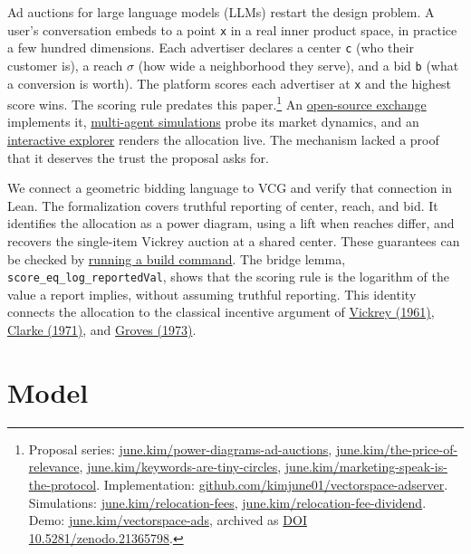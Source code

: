 Ad auctions for large language models (LLMs) restart the design problem.
A user's conversation embeds to a point \texttt{x} in a real inner
product space, in practice a few hundred dimensions. Each advertiser
declares a center \texttt{c} (who their customer is), a reach \(\sigma\)
(how wide a neighborhood they serve), and a bid \texttt{b} (what a
conversion is worth). The platform scores each advertiser at \texttt{x}
and the highest score wins. The scoring rule predates this
paper.\footnote{Proposal series:
  \href{https://june.kim/power-diagrams-ad-auctions}{june.kim/power-diagrams-ad-auctions},
  \href{https://june.kim/the-price-of-relevance}{june.kim/the-price-of-relevance},
  \href{https://june.kim/keywords-are-tiny-circles}{june.kim/keywords-are-tiny-circles},
  \href{https://june.kim/marketing-speak-is-the-protocol}{june.kim/marketing-speak-is-the-protocol}.
  Implementation:
  \href{https://github.com/kimjune01/vectorspace-adserver}{github.com/kimjune01/vectorspace-adserver}.
  Simulations:
  \href{https://june.kim/relocation-fees}{june.kim/relocation-fees},
  \href{https://june.kim/relocation-fee-dividend}{june.kim/relocation-fee-dividend}.
  Demo:
  \href{https://june.kim/vectorspace-ads/}{june.kim/vectorspace-ads},
  archived as \href{https://doi.org/10.5281/zenodo.21365798}{DOI
  10.5281/zenodo.21365798}.} An \hyperref[exchange]{open-source
exchange} implements it, \hyperref[simulations]{multi-agent simulations}
probe its market dynamics, and an \hyperref[explorer]{interactive
explorer} renders the allocation live. The mechanism lacked a proof that
it deserves the trust the proposal asks for.

We connect a geometric bidding language to VCG and verify that
connection in Lean. The formalization covers truthful reporting of
center, reach, and bid. It identifies the allocation as a power diagram,
using a lift when reaches differ, and recovers the single-item Vickrey
auction at a shared center. These guarantees can be checked by
\hyperref[formalization]{running a build command}. The bridge lemma,
\texttt{score\_eq\_log\_reportedVal}, shows that the scoring rule is the
logarithm of the value a report implies, without assuming truthful
reporting. This identity connects the allocation to the classical
incentive argument of \href{https://doi.org/10.2307/2977633}{Vickrey
(1961)}, \href{https://doi.org/10.1007/BF01726210}{Clarke (1971)}, and
\href{https://doi.org/10.2307/1914085}{Groves (1973)}.

\section{Model}\label{model}

